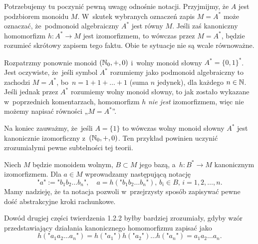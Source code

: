 \documentclass[a4paper,11pt]{article}
\begin{document}
\vspace{\spaceFour}





\start {} Potrzebujemy tu poczynić pewną uwagę odnośnie notacji.
Przyjmijmy, że $A$ jest podzbiorem monoidu $M$. W~skutek wybranych oznaczeń
zapis $M = A^{ * }$ może oznaczać, że~podmonoid algebraiczny $A^{ * }$ jest
równy $M$. Jeśli zaś kanoniczny homomorfizm $h : A^{ * } \to M$ jest
izomorfizmem, to wówczas przez $M = A^{ * }$, będzie rozumieć skrótowy
zapisem tego faktu. Obie te sytuacje nie są wcale równoważne.

Rozpatrzmy ponownie monoid $( \mathbb{N}_{ 0 }, +, 0 )$ i~wolny monoid słowny
$A^{ * } = \{ 0, 1 \}^{ * }$. Jest oczywiste, że~jeśli symbol $A^{ * }$ rozumiemy
jako podmonoid algebraiczny to zachodzi $M = A^{ * }$,
bo~$n = 1 + 1 + \ldots + 1$ (suma $n$ jedynek), dla każdego $n \in \mathbb{N}$. Jeśli
jednak przez $A^{ * }$ rozumiemy wolny monoid słowny, to jak zostało
wykazane w~poprzednich komentarzach, homomorfizm $h$ \textit{nie jest}
izomorfizmem, więc nie możemy napisać równości „$M = A^{ * }$”.

Na koniec zauważmy, że~jeśli $A = \{ 1 \}$ to wówczas wolny monoid słowny
$A^{ * }$ jest kanonicznie izomorficzny z~$( \mathbb{N}_{ 0 }, +, 0)$. Ten przykład
powinien uczynić zrozumiałymi pewne subtelności tej teorii.

\vspace{\spaceFour}





\start {} Niech $M$ będzie monoidem wolnym, $B \subset M$ jego bazą,
a~$h : B^{ * } \to M$ kanonicznym izomorfizmem. Dla $a \in M$ wprowadzamy
następującą notację
\begin{equation}
  \label{eq:Forys-Forys-19}
  \texttt{"} a \texttt{"} :=
  \texttt{"} b_{ 1 } b_{ 2 } \ldots b_{ n } \texttt{"}, \quad
  a = h( \texttt{"} b_{ 1 } b_{ 2 } \ldots b_{ n } \texttt{"} ), \,
  b_{ i } \in B,\, i = 1, 2, \ldots, n.
\end{equation}
Mamy nadzieję, że ta notacja pozwoli w~przejrzysty sposób zapisywać pewne
dość abstrakcyjne kroki rachunkowe.

\vspace{\spaceFour}





\start {} Dowód drugiej części twierdzenia 1.2.2 byłby bardziej
zrozumiały, gdyby wzór przedstawiający działania kanonicznego homomorfizmu
zapisać jako
\begin{equation}
  \label{eq:Forys-Forys-20}
  h( \texttt{"} a_{ 1 } a_{ 2 } \ldots a_{ n } \texttt{"} ) =
  h( \texttt{"} a_{ 1 } \texttt{"} ) h( \texttt{"} a_{ 2 } \texttt{"} ) \ldots
  h( \texttt{"} a_{ n } \texttt{"} ) = a_{ 1 } a_{ 2 } \ldots a_{ n }.
\end{equation}
\end{document}
